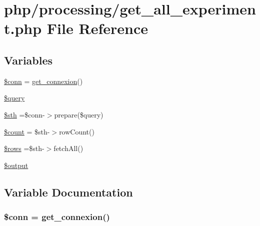 \hypertarget{processing_2get__all__experiment_8php}{\section{php/processing/get\-\_\-all\-\_\-experiment.php File Reference}
\label{processing_2get__all__experiment_8php}
}
\subsection*{Variables}
\begin{DoxyCompactItemize}
\item 
\hyperlink{processing_2get__all__experiment_8php_aa8a5a87b9c1a6a0819b88447cbe41877}{\$conn} = \hyperlink{php__functions_8php_ace18bc10f3fd08f92688ac743e0d8c2e}{get\-\_\-connexion}()
\item 
\hyperlink{processing_2get__all__experiment_8php_af59a5f7cd609e592c41dc3643efd3c98}{\$query}
\item 
\hyperlink{processing_2get__all__experiment_8php_afa9126f9664959c02795be300a135f93}{\$sth} =\$conn-\/$>$prepare(\$query)
\item 
\hyperlink{processing_2get__all__experiment_8php_af789423037bbc89dc7c850e761177570}{\$count} = \$sth-\/$>$row\-Count()
\item 
\hyperlink{processing_2get__all__experiment_8php_ace2ec39e7df3899fa8df9640ec274b03}{\$rows} =\$sth-\/$>$fetch\-All()
\item 
\hyperlink{processing_2get__all__experiment_8php_a73004ce9cd673c1bfafd1dc351134797}{\$output}
\end{DoxyCompactItemize}


\subsection{Variable Documentation}
\hypertarget{processing_2get__all__experiment_8php_aa8a5a87b9c1a6a0819b88447cbe41877}{
\subsubsection[{\$conn}]{\setlength{\rightskip}{0pt plus 5cm}\$conn = {\bf get\-\_\-connexion}()}}\label{processing_2get__all__experiment_8php_aa8a5a87b9c1a6a0819b88447cbe41877}



